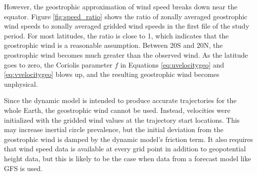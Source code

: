 However, the geostrophic approximation of wind speed breaks down near the equator.
Figure \ref{fig:speed_ratio} shows the ratio of zonally averaged geostrophic wind speeds to zonally averaged gridded wind speeds in the first file of the study period.
For most latitudes, the ratio is close to 1, which indicates that the geostrophic wind is a reasonable assumption.
Between 20S and 20N, the geostrophic wind becomes much greater than the observed wind. 
As the latitude goes to zero, the Coriolis parameter $f$ in Equations \ref{eq:uvelocitygeo} and \ref{eq:vvelocitygeo} blows up, and the resulting geostrophic wind becomes unphysical.

Since the dynamic model is intended to produce accurate trajectories for the whole Earth, the geostrophic wind cannot be used. 
Instead, velocities were initialized with the gridded wind values at the trajectory start locations. 
This may increase inertial circle prevalence, but the initial deviation from the geostrophic wind is damped by the dynamic model's friction term.
It also requires that wind speed data is available at every grid point in addition to geopotential height data, but this is likely to be the case when data from a forecast model like GFS is used.


